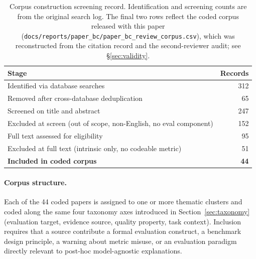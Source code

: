 \documentclass[twoside,11pt]{article}
\begin{document}
\begin{table}[t]
\centering
\caption{Corpus construction screening record. Identification and screening counts are from the original search log. The final two rows reflect the coded corpus released with this paper (\texttt{docs/reports/paper\_bc/paper\_bc\_review\_corpus.csv}), which was reconstructed from the citation record and the second-reviewer audit; see \S\ref{sec:validity}.}
\label{tab:prisma}
\begin{tabular}{lr}
\toprule
Stage & Records \\
\midrule
Identified via database searches & 312 \\
Removed after cross-database deduplication & 65 \\
Screened on title and abstract & 247 \\
Excluded at screen (out of scope, non-English, no eval component) & 152 \\
Full text assessed for eligibility & 95 \\
Excluded at full text (intrinsic only, no codeable metric) & 51 \\
\midrule
\textbf{Included in coded corpus} & \textbf{44} \\
\bottomrule
\end{tabular}
\end{table}

\paragraph{Corpus structure.}
Each of the 44 coded papers is assigned to one or more thematic clusters
and coded along the same four taxonomy axes introduced in
Section~\ref{sec:taxonomy} (evaluation target, evidence source, quality
property, task context). Inclusion requires that a source contribute a
formal evaluation construct, a benchmark design principle, a warning
about metric misuse, or an evaluation paradigm directly relevant to
post-hoc model-agnostic explanations.
\end{document}
